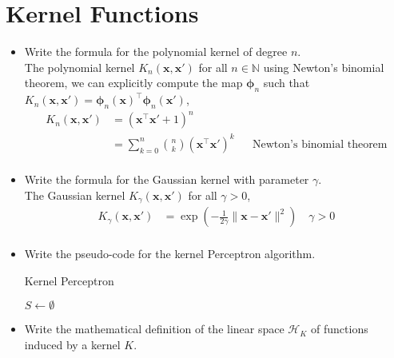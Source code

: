 \newpage
\section{Kernel Functions}

\begin{itemize}
    
    \item Write the formula for the polynomial kernel of degree $n$.\\ 

        The polynomial kernel $K_n(\boldsymbol{x}, \boldsymbol{x}')$ for all $n \in \mathbb{N}$ using Newton's binomial theorem, we can explicitly compute the map $\boldsymbol{\phi}_n$ such that $K_n(\boldsymbol{x}, \boldsymbol{x}') = \boldsymbol{\phi}_n(\boldsymbol{x})^\top \boldsymbol{\phi}_n(\boldsymbol{x}')$,
        \begin{align*}
            K_n(\boldsymbol{x}, \boldsymbol{x}') &= (\boldsymbol{x}^\top \boldsymbol{x}' + 1)^n \\
                                                 &= \sum_{k=0}^n \binom{n}{k} (\boldsymbol{x}^\top \boldsymbol{x}')^k && \text{Newton's binomial theorem} \\
        \end{align*}

    \item Write the formula for the Gaussian kernel with parameter $\gamma$.\\

        The Gaussian kernel $K_\gamma(\boldsymbol{x}, \boldsymbol{x}')$ for all $\gamma > 0$,
        \begin{align*}
            K_\gamma(\boldsymbol{x}, \boldsymbol{x}') &= \exp(-\frac{1}{2\gamma} \|\boldsymbol{x} - \boldsymbol{x}'\|^2) \quad \gamma > 0 \\
        \end{align*}


    \item Write the pseudo-code for the kernel Perceptron algorithm.\\


        \begin{algorithm}[H]
            \SetAlgoLined
            \DontPrintSemicolon
            \caption{Kernel Perceptron}
            $S \leftarrow \emptyset$ \\
        \end{algorithm}

\item Write the mathematical definition of the linear space $\mathcal{H}_K$ of functions induced by a kernel $K$.


\end{itemize}
